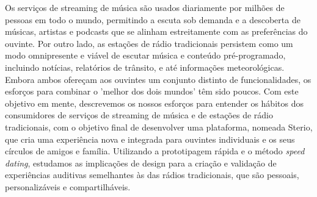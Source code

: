 \noindent Os serviços de streaming de música são usados ​​diariamente por milhões de pessoas em todo o mundo, permitindo a escuta sob demanda e a descoberta de músicas, artistas e podcasts que se alinham estreitamente com as preferências do ouvinte. Por outro lado, as estações de rádio tradicionais persistem como um modo omnipresente e viável de escutar música e conteúdo pré-programado, incluindo notícias, relatórios de trânsito, e até informações meteorológicas. Embora ambos ofereçam aos ouvintes um conjunto distinto de funcionalidades, os esforços para combinar o 'melhor dos dois mundos' têm sido poucos. Com este objetivo em mente, descrevemos os nossos esforços para entender os hábitos dos consumidores de serviços de streaming de música e de estações de rádio tradicionais, com o objetivo final de desenvolver uma plataforma, nomeada Sterio, que cria uma experiência nova e integrada para ouvintes individuais e os seus círculos de amigos e família. Utilizando a prototipagem rápida e o método \textit{speed dating}, estudamos as implicações de design para a criação e validação de experiências auditivas semelhantes às das rádios tradicionais, que são pessoais, personalizáveis ​​e compartilháveis.